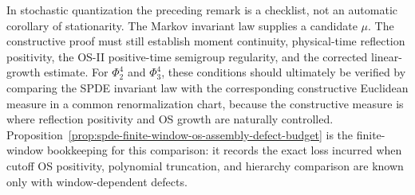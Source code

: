 In stochastic quantization the preceding remark is a checklist, not an automatic
corollary of stationarity.  The Markov invariant law supplies a candidate
\(\mu\).  The constructive proof must still establish moment continuity,
physical-time reflection positivity, the OS-II positive-time semigroup
regularity, and the corrected linear-growth estimate.  For \(\Phi^4_2\) and
\(\Phi^4_3\), these conditions should ultimately be verified by comparing
the SPDE invariant law with the corresponding constructive Euclidean measure
in a common renormalization chart, because the constructive measure is where
reflection positivity and OS growth are naturally controlled.
Proposition~\ref{prop:spde-finite-window-os-assembly-defect-budget} is the
finite-window bookkeeping for this comparison: it records the exact loss
incurred when cutoff OS positivity, polynomial truncation, and hierarchy
comparison are known only with window-dependent defects.


